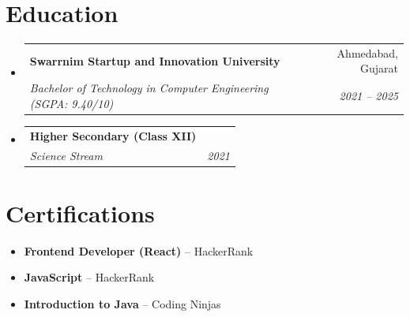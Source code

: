 \documentclass[letterpaper,11pt]{article}
\makeatletter
\newcommand{\resumeItem}[1]{
  \item\small{{#1 \vspace{-2pt}}}
}
\newcommand{\resumeSubheading}[4]{
  \vspace{-1pt}\item
    \begin{tabular*}{0.97\textwidth}[t]{l@{\extracolsep{\fill}}r}
      \textbf{#1} & #2 \\
      \textit{\small#3} & \textit{\small #4} \\
    \end{tabular*}\vspace{-5pt}
}
\newcommand{\resumeSubHeadingListStart}{\begin{itemize}[leftmargin=0.15in, label={}]}
\newcommand{\resumeSubHeadingListEnd}{\end{itemize}}
\makeatother
\begin{document}
\section{Education}
\resumeSubHeadingListStart
\resumeSubheading
{Swarrnim Startup and Innovation University}{Ahmedabad, Gujarat}
{Bachelor of Technology in Computer Engineering (SGPA: 9.40/10)}{2021 -- 2025}

\resumeSubheading
{Higher Secondary (Class XII)}{}
{Science Stream}{2021}
\resumeSubHeadingListEnd

\section{Certifications}
\resumeSubHeadingListStart
\resumeItem{\textbf{Frontend Developer (React)} -- HackerRank}
\resumeItem{\textbf{JavaScript} -- HackerRank}
\resumeItem{\textbf{Introduction to Java} -- Coding Ninjas}
\resumeSubHeadingListEnd
\end{document}
